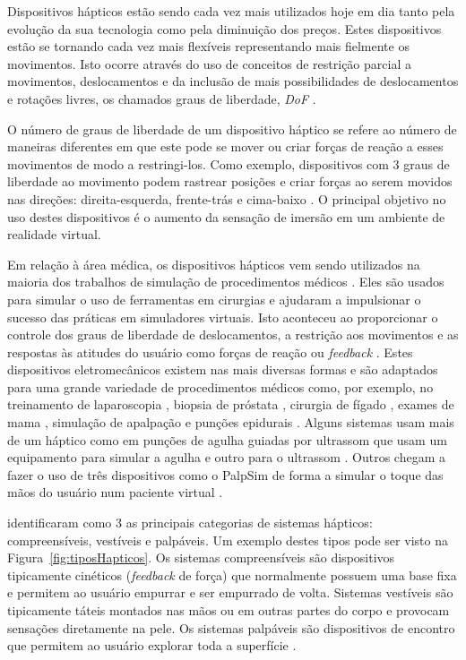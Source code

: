 Dispositivos hápticos estão sendo cada vez mais utilizados hoje em dia tanto pela evolução da sua tecnologia como pela diminuição dos preços. Estes dispositivos estão se tornando cada vez mais flexíveis representando mais fielmente os movimentos. Isto ocorre  através do uso de conceitos de restrição parcial a movimentos, deslocamentos e da inclusão de mais possibilidades de deslocamentos e rotações livres, os chamados graus de liberdade, \textit{\acrfull{DoF}} \cite{Chen2022}.


O número de graus de liberdade de um dispositivo háptico se refere ao número de maneiras diferentes em que este pode se mover ou criar forças de reação a esses movimentos de modo a restringi-los. Como exemplo, dispositivos com 3 graus de liberdade ao movimento podem rastrear posições e criar forças ao serem movidos nas direções: direita-esquerda, frente-trás e cima-baixo \cite{HAPTICSHOUSE2019}. O principal objetivo no uso destes dispositivos é o aumento da sensação de imersão em um ambiente de realidade virtual. 

Em relação à área médica, os dispositivos hápticos vem sendo utilizados na maioria dos trabalhos de simulação de procedimentos médicos \cite{Escobar-Castillejos2016, Moo-Young2021}. Eles são usados para simular o uso de ferramentas em cirurgias e ajudaram a impulsionar o sucesso das práticas em simuladores virtuais. Isto aconteceu ao proporcionar o controle dos graus de liberdade de deslocamentos, a restrição aos movimentos e as respostas às atitudes do usuário como forças de reação ou \textit{feedback} \cite{Gerovich2004}. Estes dispositivos eletromecânicos existem nas mais diversas formas e são adaptados para uma grande variedade de procedimentos médicos como, por exemplo, no treinamento de laparoscopia \cite{Srinivasan2004}, biopsia de próstata \cite{Sclaverano2009}, cirurgia de fígado \cite{Mastmeyer2016}, exames de mama \cite{Brazil2017,Jeon2010,Ribeiro2014,Solanki2010}, simulação de apalpação \cite{Ribeiro2016} e punções epidurais \cite{N.2013, Brazil2018}. Alguns sistemas usam mais de um háptico como em punções de agulha guiadas por ultrassom que usam um equipamento para simular a agulha e outro para o ultrassom \cite{Ni2011,Vidal2008}. Outros chegam a fazer o uso de três dispositivos como o PalpSim de forma a simular o toque das mãos do usuário num paciente virtual \cite{Coles2011b}. 

\textcite{Culbertson2018} identificaram como 3 as principais categorias de sistemas hápticos: compreensíveis, vestíveis e palpáveis. Um exemplo  destes tipos pode ser visto na Figura~\ref{fig:tiposHapticos}. Os sistemas compreensíveis são dispositivos tipicamente cinéticos (\textit{feedback} de força) que normalmente possuem uma base fixa e permitem ao usuário empurrar e ser empurrado de volta. Sistemas vestíveis são tipicamente táteis montados nas mãos ou em outras partes do corpo e provocam sensações diretamente na pele. Os sistemas palpáveis são dispositivos de encontro que permitem ao usuário explorar toda a superfície \cite{Culbertson2018}. 

